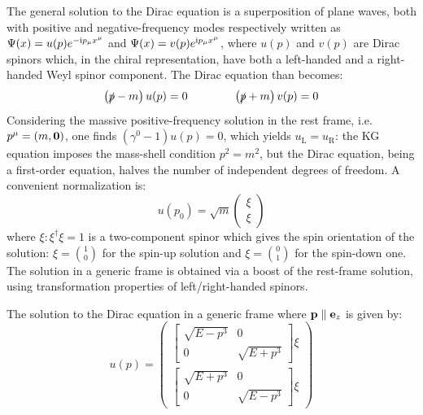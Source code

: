The general solution to the Dirac equation is a superposition of plane waves, both with positive and negative-frequency modes respectively written as $ \Psi(x) = u(p) e^{-\mathrm{i} p_\mu x^\mu} $ and $ \Psi(x) = v(p) e^{\mathrm{i} p_\mu x^\mu} $, where $ u(p) $ and $ v(p) $ are Dirac spinors which, in the chiral representation, have both a left-handed and a right-handed Weyl spinor component. The Dirac equation than becomes:
\begin{equation}
  \left( \slashed{p} - m \right) u(p) = 0
  \qquad \qquad
  \left( \slashed{p} + m \right) v(p) = 0
  \label{eq:dirac-eq-spinors}
\end{equation}
Considering the massive positive-frequency solution in the rest frame, i.e. $ p^\mu = (m, \mathbf{0}) $, one finds $ (\gamma^0 - 1) u(p) = 0 $, which yields $ u_\text{L} = u_\text{R} $: the KG equation imposes the mass-shell condition $ p^2 = m^2 $, but the Dirac equation, being a first-order equation, halves the number of independent degrees of freedom. A convenient normalization is:
\begin{equation*}
  u(p_0) = \sqrt{m}
  \begin{pmatrix}
    \xi \\ \xi
  \end{pmatrix}
\end{equation*}
where $ \xi : \xi^\dagger \xi = 1 $ is a two-component spinor which gives the spin orientation of the solution: $ \xi = \binom{1}{0} $ for the spin-up solution and $ \xi = \binom{0}{1} $ for the spin-down one.\\
The solution in a generic frame is obtained via a boost of the rest-frame solution, using transformation properties of left/right-handed spinors.

\begin{proposition}{}{}
  The solution to the Dirac equation in a generic frame where $ \mathbf{p} \parallel \mathbf{e}_z $ is given by:
  \begin{equation}
    u(p) =
    \begin{pmatrix}
      \begin{bmatrix}
        \sqrt{E - p^3} & 0 \\ 0 & \sqrt{E + p^3}
      \end{bmatrix} \xi \\
      \begin{bmatrix}
        \sqrt{E + p^3} & 0 \\ 0 & \sqrt{E - p^3}
      \end{bmatrix} \xi
    \end{pmatrix}
    \label{eq:u-spinor-p3-frame}
  \end{equation}
\end{proposition}

